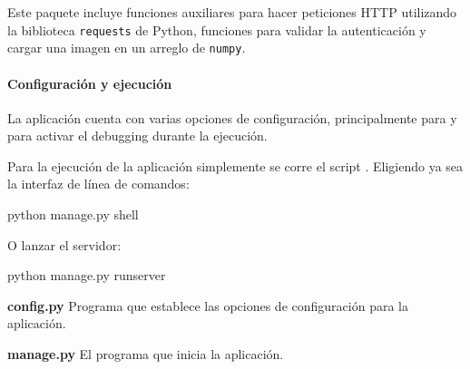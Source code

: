 Este paquete incluye funciones auxiliares
para hacer peticiones HTTP utilizando la biblioteca 
\texttt{requests} de Python, funciones para validar
la autenticación y cargar una imagen en un arreglo
de \texttt{numpy}.


\paragraph{Configuración y ejecución}
\label{\detokenize{chapter_two/desc_cloudnao:configuracion-y-ejecucion}}
La aplicación cuenta con varias opciones de configuración, principalmente
para  y para activar el debugging durante la ejecución.

Para la ejecución de la aplicación simplemente se corre el
script . Eligiendo ya sea la interfaz de línea de comandos:

\begin{sphinxVerbatim}[commandchars=\\\{\}]
\PYGZdl{} python manage.py shell
\end{sphinxVerbatim}

O lanzar el servidor:

\begin{sphinxVerbatim}[commandchars=\\\{\}]
\PYGZdl{} python manage.py runserver
\end{sphinxVerbatim}


\textbf{config.py}
\label{\detokenize{chapter_two/desc_cloudnao:config-py}}\label{\detokenize{chapter_two/desc_cloudnao:module-config}}
Programa que establece las opciones de configuración para la
aplicación.

\textbf{manage.py}
\label{\detokenize{chapter_two/desc_cloudnao:module-manage}}\label{\detokenize{chapter_two/desc_cloudnao:manage-py}}
El programa que inicia la aplicación.

